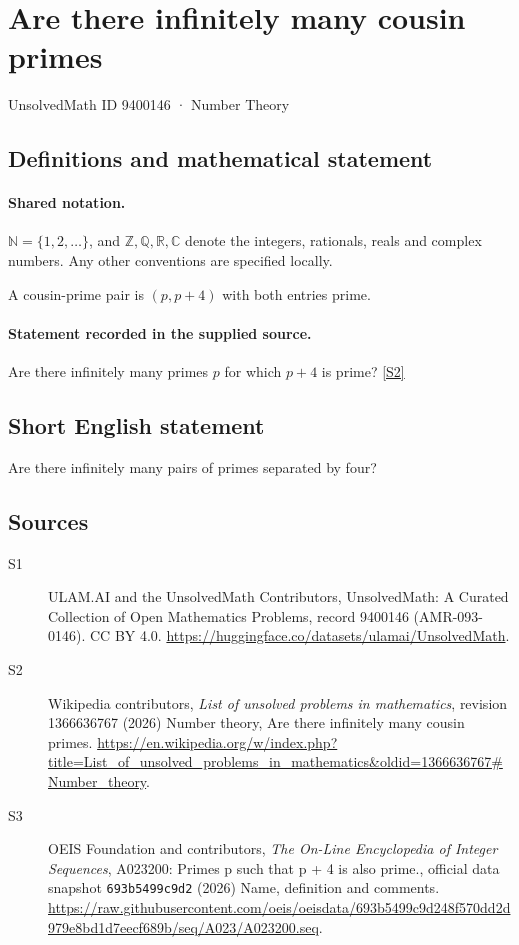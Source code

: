 \documentclass[11pt]{article}
\newcommand{\sref}[2]{\hyperlink{source:#1:#2}{[S#2]}}
\begin{document}
\setcounter{section}{9400145}
\section{Are there infinitely many cousin primes}\label{9400146}
{\small\sffamily UnsolvedMath ID 9400146 · Number Theory}
\subsection{Definitions and mathematical statement}

\paragraph{Shared notation.}$\mathbb N=\{1,2,\ldots\}$, and $\mathbb Z,\mathbb Q,\mathbb R,\mathbb C$ denote the integers, rationals, reals and complex numbers. Any other conventions are specified locally.


A cousin-prime pair is $(p,p+4)$ with both entries prime.
\paragraph{Statement recorded in the supplied source.}
Are there infinitely many primes $p$ for which $p+4$ is prime? \sref{9400146}{2}
\subsection{Short English statement}
Are there infinitely many pairs of primes separated by four?
\subsection{Sources}
\begin{description}
\item[\hypertarget{source:9400146:1}{S1}] ULAM.AI and the UnsolvedMath Contributors, UnsolvedMath: A Curated Collection of Open Mathematics Problems, record 9400146 (AMR-093-0146). CC BY 4.0. \url{https://huggingface.co/datasets/ulamai/UnsolvedMath}.
\item[\hypertarget{source:9400146:2}{S2}] Wikipedia contributors, \emph{List of unsolved problems in mathematics}, revision 1366636767 (2026) Number theory, Are there infinitely many cousin primes. \url{https://en.wikipedia.org/w/index.php?title=List_of_unsolved_problems_in_mathematics&oldid=1366636767#Number_theory}.
\item[\hypertarget{source:9400146:3}{S3}] OEIS Foundation and contributors, \emph{The On-Line Encyclopedia of Integer Sequences}, A023200: Primes p such that p + 4 is also prime., official data snapshot \texttt{693b5499c9d2} (2026) Name, definition and comments. \url{https://raw.githubusercontent.com/oeis/oeisdata/693b5499c9d248f570dd2d979e8bd1d7eecf689b/seq/A023/A023200.seq}.
\end{description}
\label{end:9400146}
\end{document}
